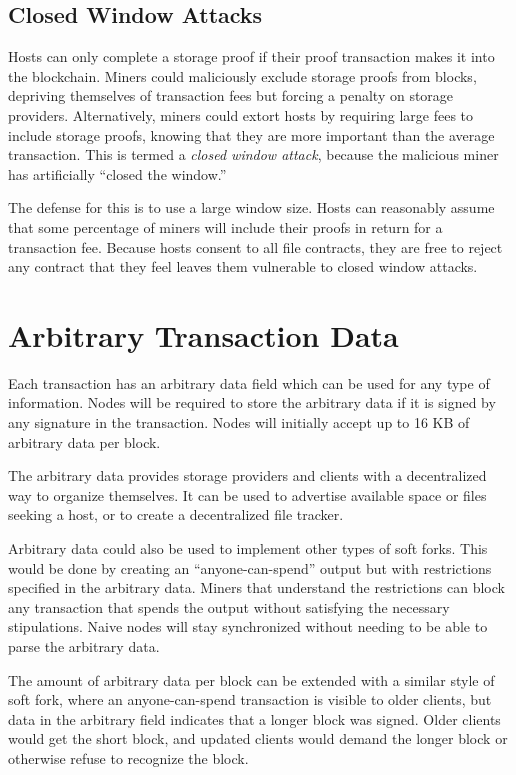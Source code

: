 \documentclass[twocolumn]{article}
\begin{document}
\subsection{Closed Window Attacks}
Hosts can only complete a storage proof if their proof transaction makes it into the blockchain.
Miners could maliciously exclude storage proofs from blocks, depriving themselves of transaction fees but forcing a penalty on storage providers.
Alternatively, miners could extort hosts by requiring large fees to include storage proofs, knowing that they are more important than the average transaction.
This is termed a \textit{closed window attack}, because the malicious miner has artificially ``closed the window.''

The defense for this is to use a large window size.
Hosts can reasonably assume that some percentage of miners will include their proofs in return for a transaction fee.
Because hosts consent to all file contracts, they are free to reject any contract that they feel leaves them vulnerable to closed window attacks.

\section{Arbitrary Transaction Data}
Each transaction has an arbitrary data field which can be used for any type of information.
Nodes will be required to store the arbitrary data if it is signed by any signature in the transaction.
Nodes will initially accept up to 16 KB of arbitrary data per block.

The arbitrary data provides storage providers and clients with a decentralized way to organize themselves.
It can be used to advertise available space or files seeking a host, or to create a decentralized file tracker.

Arbitrary data could also be used to implement other types of soft forks.
This would be done by creating an ``anyone-can-spend'' output but with restrictions specified in the arbitrary data.
Miners that understand the restrictions can block any transaction that spends the output without satisfying the necessary stipulations.
Naive nodes will stay synchronized without needing to be able to parse the arbitrary data.

The amount of arbitrary data per block can be extended with a similar style of soft fork, where an anyone-can-spend transaction is visible to older clients, but data in the arbitrary field indicates that a longer block was signed.
Older clients would get the short block, and updated clients would demand the longer block or otherwise refuse to recognize the block.
\end{document}
